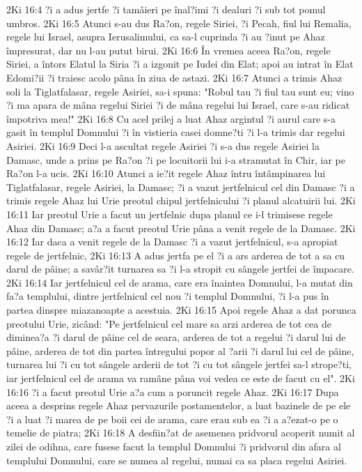 2Ki 16:4  ?i a adus jertfe ?i tamâieri pe înal?imi ?i dealuri ?i sub tot pomul umbros.
2Ki 16:5  Atunci s-au dus Ra?on, regele Siriei, ?i Pecah, fiul lui Remalia, regele lui Israel, asupra Ierusalimului, ca sa-l cuprinda ?i au ?inut pe Ahaz împresurat, dar nu l-au putut birui.
2Ki 16:6  În vremea aceea Ra?on, regele Siriei, a întors Elatul la Siria ?i a izgonit pe Iudei din Elat; apoi au intrat în Elat Edomi?ii ?i traiesc acolo pâna în ziua de astazi.
2Ki 16:7  Atunci a trimis Ahaz soli la Tiglatfalasar, regele Asiriei, sa-i spuna: "Robul tau ?i fiul tau sunt eu; vino ?i ma apara de mâna regelui Siriei ?i de mâna regelui lui Israel, care s-au ridicat împotriva mea!"
2Ki 16:8  Cu acel prilej a luat Ahaz argintul ?i aurul care s-a gasit în templul Domnului ?i în vistieria casei domne?ti ?i l-a trimis dar regelui Asiriei.
2Ki 16:9  Deci l-a ascultat regele Asiriei ?i s-a dus regele Asiriei la Damasc, unde a prins pe Ra?on ?i pe locuitorii lui i-a stramutat în Chir, iar pe Ra?on l-a ucis.
2Ki 16:10  Atunci a ie?it regele Ahaz întru întâmpinarea lui Tiglatfalasar, regele Asiriei, la Damasc; ?i a vazut jertfelnicul cel din Damasc ?i a trimis regele Ahaz lui Urie preotul chipul jertfelnicului ?i planul alcatuirii lui.
2Ki 16:11  Iar preotul Urie a facut un jertfelnic dupa planul ce i-l trimisese regele Ahaz din Damasc; a?a a facut preotul Urie pâna a venit regele de la Damasc.
2Ki 16:12  Iar daca a venit regele de la Damasc ?i a vazut jertfelnicul, s-a apropiat regele de jertfelnic,
2Ki 16:13  A adus jertfa pe el ?i a ars arderea de tot a sa cu darul de pâine; a savâr?it turnarea sa ?i l-a stropit cu sângele jertfei de împacare.
2Ki 16:14  Iar jertfelnicul cel de arama, care era înaintea Domnului, l-a mutat din fa?a templului, dintre jertfelnicul cel nou ?i templul Domnului, ?i l-a pus în partea dinspre miazanoapte a acestuia.
2Ki 16:15  Apoi regele Ahaz a dat porunca preotului Urie, zicând: "Pe jertfelnicul cel mare sa arzi arderea de tot cea de diminea?a ?i darul de pâine cel de seara, arderea de tot a regelui ?i darul lui de pâine, arderea de tot din partea întregului popor al ?arii ?i darul lui cel de pâine, turnarea lui ?i cu tot sângele arderii de tot ?i cu tot sângele jertfei sa-l strope?ti, iar jertfelnicul cel de arama va ramâne pâna voi vedea ce este de facut cu el".
2Ki 16:16  ?i a facut preotul Urie a?a cum a poruncit regele Ahaz.
2Ki 16:17  Dupa aceea a desprins regele Ahaz pervazurile postamentelor, a luat bazinele de pe ele ?i a luat ?i marea de pe boii cei de arama, care erau sub ea ?i a a?ezat-o pe o temelie de piatra;
2Ki 16:18  A desfiin?at de asemenea pridvorul acoperit numit al zilei de odihna, care fusese facut la templul Domnului ?i pridvorul din afara al templului Domnului, care se numea al regelui, numai ca sa placa regelui Asiriei.
